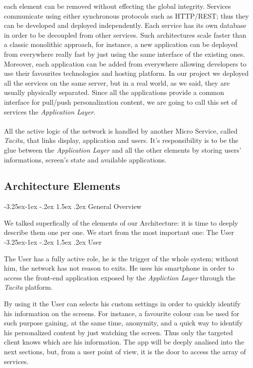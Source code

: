 \documentclass[]{usiinfbachelorproject}
\makeatletter
\newcommand\subsubsection{\@startsection{subsubsection}{3}{\z@}%
                {-3.25ex\@plus -1ex \@minus -.2ex}%
                {1.5ex \@plus .2ex}%
                {\normalfont\normalsize\bfseries}}
\makeatother
\begin{document}
each element can be removed without effecting the global integrity. Services communicate using either synchronous protocols such as HTTP/REST; thus they can be developed and deployed independently. Each service has its own database in order to be decoupled from other services. Such architectures scale faster than a classic monolithic approach, for instance, a new application can be deployed from everywhere really fast by just using the same interface of the existing ones. Moreover, each application can be added from everywhere allowing developers to use their favourites technologies and hosting platform.
In our project we deployed all the services on the same server, but in a real world, as we said,  they are usually physically separated. Since all the applications provide a common interface for pull/push personalization content, we are going to call this set of services the \emph{Application Layer}.\\
\\
All the active logic of the network is handled by another Micro Service, called \emph{Tacita}, that links display, application and users. It's responsibility is to be the glue between the \emph{Application Layer} and all the other elements by storing users' informations, screen's state and available applications.

\subsection{Architecture Elements}
\subsubsection{General Overview}

We talked superfically of the elements of our Architecture: it is time to deeply describe them one per one. We start from the most important one: The User  
\subsubsection{User}

The User has a fully active role, he is the trigger of the whole system; without him, the network has not reason to exits. He uses his smartphone in order to access the front-end application exposed by the \emph{Appliction Layer} through the \emph{Tacita} platform.

By using it the User can selects his custom settings in order to quickly identify his information on the screens. For instance, a favourite colour can be used for such purpose gaining, at the same time, anonymity, and a quick way to identify his personalized content by just watching the screen. Thus only the targeted client knows which are his information. The app will be deeply analised into the next sections, but, from a user point of view, it is the door to access the array of services.
\end{document}
